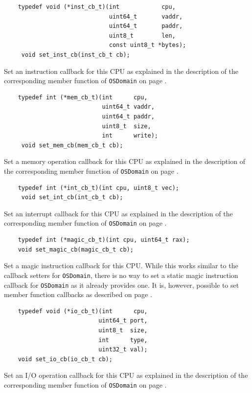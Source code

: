 \documentclass[letterpaper, 10pt]{book}
\begin{document}
\begin{verbatim}
    typedef void (*inst_cb_t)(int            cpu, 
                              uint64_t       vaddr, 
                              uint64_t       paddr, 
                              uint8_t        len, 
                              const uint8_t *bytes);
     void set_inst_cb(inst_cb_t cb);
\end{verbatim}
Set an instruction callback for this CPU as explained in the 
description of the corresponding member function of \texttt{OSDomain} on page
\pageref{func:set_inst_cb}.

\begin{verbatim}
    typedef int (*mem_cb_t)(int      cpu,
                            uint64_t vaddr,
                            uint64_t paddr, 
                            uint8_t  size, 
                            int      write);
     void set_mem_cb(mem_cb_t cb);
\end{verbatim}
Set a memory operation callback for this CPU as explained in the 
description of the corresponding member function of \texttt{OSDomain} on page
\pageref{func:set_mem_cb}.

\begin{verbatim}
    typedef int (*int_cb_t)(int cpu, uint8_t vec);
     void set_int_cb(int_cb_t cb);
\end{verbatim}
Set an interrupt callback for this CPU as explained in the 
description of the corresponding member function of \texttt{OSDomain} on page
\pageref{func:set_int_cb}.

\begin{verbatim}
    typedef int (*magic_cb_t)(int cpu, uint64_t rax);
    void set_magic_cb(magic_cb_t cb);
\end{verbatim}
Set a magic instruction callback for this CPU. While this works similar to the
callback setters for \texttt{OSDomain}, there is no way to set a static magic
instruction callback for \texttt{OSDomain} as it already provides one. It is,
however, possible to set member function callbacks as described on page
\pageref{tf:set_magic_cb}.

\begin{verbatim}
    typedef void (*io_cb_t)(int      cpu, 
                           uint64_t port, 
                           uint8_t  size, 
                           int      type, 
                           uint32_t val);
    void set_io_cb(io_cb_t cb);
\end{verbatim}
Set an I/O operation callback for this CPU as explained in the 
description of the corresponding member function of \texttt{OSDomain} on page
\pageref{func:set_io_cb}.
\end{document}
